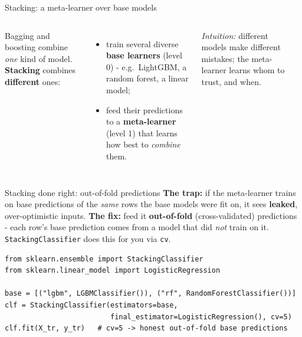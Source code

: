 \documentclass[aspectratio=169]{beamer}
\begin{document}
\begin{frame}{Stacking: a meta-learner over base models}
  \begin{columns}[T]
    Bagging and boosting combine \emph{one} kind of model. \textbf{Stacking} combines
    \textbf{different} ones:
    \begin{itemize}\small
      \item train several diverse \textbf{base learners} (level 0) - e.g.\ LightGBM, a random
        forest, a linear model;
      \item feed their predictions to a \textbf{meta-learner} (level 1) that learns how best to
        \emph{combine} them.
    \end{itemize}
    {\footnotesize \emph{Intuition:} different models make different mistakes; the meta-learner
    learns whom to trust, and when.}
    \begin{center}
    \end{center}
  \end{columns}
\end{frame}

\begin{frame}[fragile]{Stacking done right: out-of-fold predictions}
  \textbf{The trap:} if the meta-learner trains on base predictions of the \emph{same} rows the
  base models were fit on, it sees \textbf{leaked}, over-optimistic inputs.
  \vskip 3pt
  \textbf{The fix:} feed it \textbf{out-of-fold} (cross-validated) predictions - each row's base
  prediction comes from a model that did \emph{not} train on it. \texttt{StackingClassifier} does
  this for you via \texttt{cv}.
  \vskip 4pt
\begin{lstlisting}[basicstyle=\ttfamily\scriptsize]
from sklearn.ensemble import StackingClassifier
from sklearn.linear_model import LogisticRegression

base = [("lgbm", LGBMClassifier()), ("rf", RandomForestClassifier())]
clf = StackingClassifier(estimators=base,
                         final_estimator=LogisticRegression(), cv=5)
clf.fit(X_tr, y_tr)   # cv=5 -> honest out-of-fold base predictions
\end{lstlisting}
\end{frame}
\end{document}
